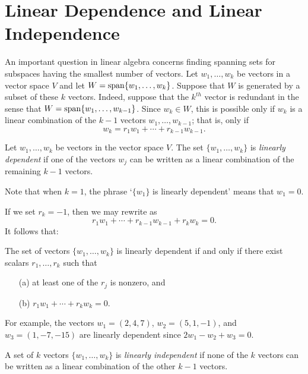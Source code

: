 \documentclass{ximera}
\begin{document}
\section{Linear Dependence and Linear Independence} \label{S:5.4}

An important question in linear algebra concerns finding spanning
sets for subspaces having the smallest
number of vectors. Let $w_1,\ldots,w_k$ be vectors in a vector
space $V$ and let $W={\rm span}\{w_1,\ldots,w_k\}$.  
Suppose that $W$ is generated by a subset of these $k$ vectors.
Indeed, suppose that the $k^{th}$ vector is redundant in the
sense that $W={\rm span}\{w_1,\ldots,w_{k-1}\}$.  Since $w_k\in W$,
this is possible only if $w_k$ is a linear combination of the
$k-1$ vectors $w_1,\ldots,w_{k-1}$; that is, only if
\begin{equation}  \label{e:depend}
w_k = r_1w_1 + \cdots + r_{k-1}w_{k-1}.
\end{equation}
\begin{Def}  \label{lineardependence}
Let $w_1,\ldots,w_k$ be vectors in the vector space $V$.  The set
$\{w_1,\ldots,w_k\}$ is {\em linearly dependent\/} if one of the vectors
$w_j$ can be written as a linear combination of the remaining $k-1$ vectors.
\end{Def}  
Note that when $k=1$, the phrase `$\{w_1\}$ is linearly dependent'
means that $w_1=0$.

If we set $r_k=-1$, then we may rewrite  as
\[
r_1w_1 + \cdots + r_{k-1}w_{k-1} + r_k w_k =0.
\]
It follows that:
\begin{lemma}  \label{L:lindep}
The set of vectors $\{w_1,\ldots,w_k\}$ is linearly dependent if and
only if there exist scalars $r_1,\ldots,r_k$ such that
\begin{itemize}
\item[(a)]   at least one of the $r_j$ is nonzero, and
\item[(b)]   $r_1w_1 + \cdots + r_k w_k =0.$
\end{itemize}
\end{lemma}

For example, the vectors $w_1=(2,4,7)$, $w_2=(5,1,-1)$, and
$w_3=(1,-7,-15)$ are linearly dependent since $2w_1-w_2+w_3=0$.

\begin{Def}  \label{linearindependence}
A set of $k$ vectors $\{w_1,\ldots,w_k\}$ is {\em linearly
independent\/} if none of the $k$ vectors can be written as a
linear combination of the other $k-1$ vectors.
\end{Def} 
\end{document}
